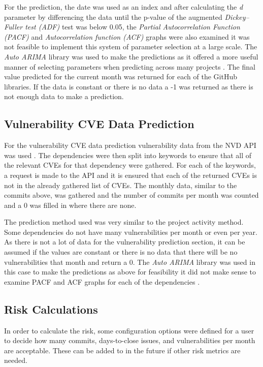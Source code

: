 \documentclass[conference]{IEEEtran}
\begin{document}
For the prediction, the date was used as an index and after calculating the \textit{d} parameter by differencing the data until the p-value of the augmented \textit{Dickey–Fuller test (ADF)} test was below 0.05, the \textit{Partial Autocorrelation Function (PACF)} and \textit{Autocorrelation function (ACF)} graphs were also examined it was not feasible to implement this system of parameter selection at a large scale. The \textit{Auto ARIMA} library was used to make the predictions as it offered a more useful manner of selecting parameters when predicting across many projects \cite{noauthor_pmdarima_nodate}. The final value predicted for the current month was returned for each of the GitHub libraries. If the data is constant or there is no data a -1 was returned as there is not enough data to make a prediction. 

\subsection{Vulnerability CVE Data Prediction}
For the vulnerability CVE data prediction vulnerability data from the NVD API was used \cite{noauthor_vulnerability_nodate}. The dependencies were then split into keywords to ensure that all of the relevant CVEs for that dependency were gathered. For each of the keywords, a request is made to the API and it is ensured that each of the returned CVEs is not in the already gathered list of CVEs. The monthly data, similar to the commits above, was gathered and the number of commits per month was counted and a 0 was filled in where there are none. 

The prediction method used was very similar to the project activity method. Some dependencies do not have many vulnerabilities per month or even per year. As there is not a lot of data for the vulnerability prediction section, it can be assumed if the values are constant or there is no data that there will be no vulnerabilities that month and return a 0. The \textit{Auto ARIMA} library was used in this case to make the predictions as above for feasibility it did not make sense to examine PACF and ACF graphs for each of the dependencies \cite{noauthor_pmdarima_nodate}. 


\subsection{Risk Calculations}
In order to calculate the risk, some configuration options were defined for a user to decide how many commits, days-to-close issues, and vulnerabilities per month are acceptable. These can be added to in the future if other risk metrics are needed. 
\end{document}
